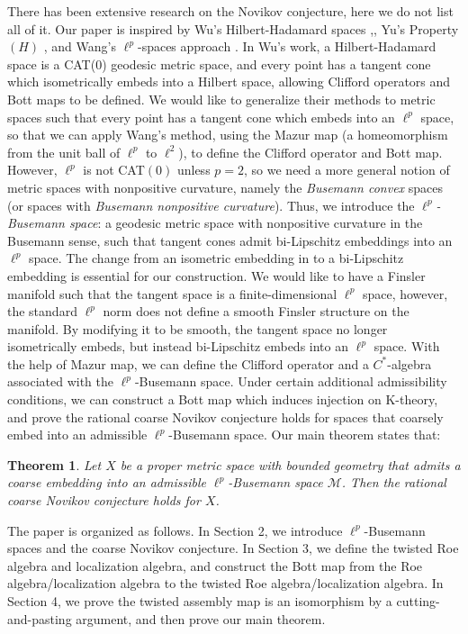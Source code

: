 \documentclass{article}
\theoremstyle{plain}
\newtheorem{theorem}{Theorem}[section]
\theoremstyle{definition}
\theoremstyle{remark}
\begin{document}
	There has been extensive research on the Novikov conjecture, here we do not list all of it. Our paper is inspired by Wu's Hilbert-Hadamard spaces \cite{gong2023novikov},\cite{gong2021novikov}, Yu's Property $(H)$ \cite{kasparov2012novikov}, and Wang's $\ell^p$-spaces approach \cite{guo2024bott}. In Wu's work, a Hilbert-Hadamard space is a CAT(0) geodesic metric space, and every point has a tangent cone which isometrically embeds into a Hilbert space, allowing Clifford operators and Bott maps to be defined. We would like to generalize their methods to metric spaces such that every point has a tangent cone which  embeds into an $\ell^p$ space, so that we can apply Wang's method, using the Mazur map (a homeomorphism from the unit ball of $\ell^p$ to $\ell^2$), to define the Clifford operator and Bott map. However, $\ell^p$ is not CAT$(0)$ unless $p=2$, so we need a more general notion of metric spaces with nonpositive curvature, namely the \emph{Busemann convex} spaces (or spaces with \emph{Busemann nonpositive curvature}). Thus, we introduce the \emph{$\ell^p$-Busemann space}: a geodesic metric space with nonpositive curvature in the Busemann sense, such that tangent cones admit bi-Lipschitz embeddings into an $\ell^p$ space. The change from an isometric embedding in \cite{gong2021novikov} to a bi-Lipschitz embedding is essential for our construction. We would like to have a Finsler manifold such that the tangent space is a finite-dimensional $\ell^p$ space, however, the standard $\ell^p$ norm does not define a smooth Finsler structure on the manifold. By modifying it to be smooth, the tangent space no longer isometrically embeds, but instead bi-Lipschitz embeds into an $\ell^p$ space. With the help of Mazur map, we can define the Clifford operator and a $C^*$-algebra associated with the $\ell^p$-Busemann space. Under certain additional admissibility conditions, we can construct a Bott map which induces injection on K-theory, and prove the rational coarse Novikov conjecture holds for spaces that coarsely embed into an admissible $\ell^p$-Busemann space.
	Our main theorem states that:
	\begin{theorem}\label{mainthm}
		Let \(X\) be a proper metric space with bounded geometry that admits a coarse embedding into an admissible \(\ell^p\)-Busemann space \(\mathcal M\). Then the rational coarse Novikov conjecture holds for \(X\).
	\end{theorem}
	The paper is organized as follows. In Section 2, we introduce $\ell^p$-Busemann spaces and the coarse Novikov conjecture. In Section 3, we define the twisted Roe algebra and localization algebra, and construct the Bott map from the Roe algebra/localization algebra to the twisted Roe algebra/localization algebra. In Section 4, we prove the twisted assembly map is an isomorphism by a cutting-and-pasting argument, and then prove our main theorem.
	
\end{document}
